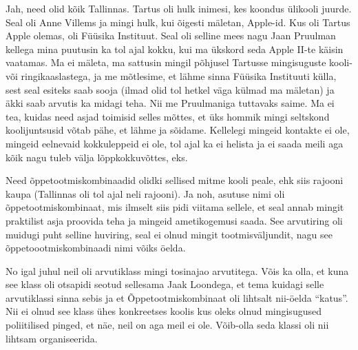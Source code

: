 Jah, need olid kõik Tallinnas. Tartus oli hulk inimesi, kes koondus ülikooli 
juurde. Seal oli Anne Villems ja mingi hulk, kui 
õigesti mäletan,  Apple-id. Kus oli Tartus Apple olemas, oli Füüsika 
Instituut. Seal oli selline mees nagu Jaan 
Pruulman kellega mina puutusin ka tol ajal  kokku, 
kui  ma ükskord seda Apple II-te käisin vaatamas. Ma ei 
mäleta, ma sattusin mingil põhjusel Tartusse mingisuguste kooli- või 
ringikaaslastega, ja  me mõtlesime, et lähme sinna Füüsika Instituuti külla, 
sest seal esiteks saab sooja (ilmad olid tol hetkel väga külmad ma mäletan) ja 
äkki saab arvutis ka midagi teha. Nii me Pruulmaniga tuttavaks saime. Ma ei 
tea, kuidas need asjad toimisid selles mõttes, et üks hommik mingi seltskond 
koolijuntsusid võtab pähe, et lähme ja sõidame. Kellelegi mingeid kontakte ei 
ole, mingeid eelnevaid kokkuleppeid ei ole, tol ajal ka ei helista ja ei saada 
meili aga kõik nagu tuleb välja lõppkokkuvõttes, eks.

\label{content!OTK}

Need õppetootmiskombinaadid olidki sellised mitme kooli peale, ehk siis rajooni 
kaupa (Tallinnas oli tol ajal neli rajooni). 
Ja noh, asutuse nimi oli õppetootmiskombinaat, mis ilmselt siis pidi viitama 
sellele, et seal annab mingit praktilist asja proovida teha ja mingeid 
ametikogemusi saada. See arvutiring oli muidugi puht selline huviring, seal ei 
olnud mingit  tootmisväljundit, nagu see õppetoootmiskombinaadi nimi võiks 
öelda.


No igal juhul neil oli arvutiklass mingi tosinajao arvutitega. Võis ka olla, et 
kuna see klass oli otsapidi seotud sellesama Jaak Loondega, et tema kuidagi selle arvutiklassi sinna sebis ja et 
Õppetootmiskombinaat oli lihtsalt nii-öelda \enquote{katus}. Nii  ei olnud see 
klass ühes konkreetses koolis kus oleks olnud mingisugused poliitilised pinged, 
et näe, neil on aga meil ei ole. Võib-olla seda klassi oli nii lihtsam 
organiseerida. 


